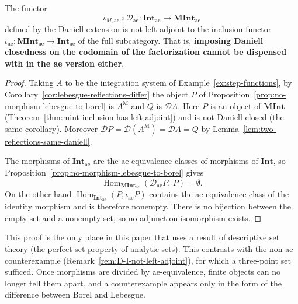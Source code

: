 \begin{corollary}\label{cor:ae-completeness-needed}
  The functor
  \[
    \iota_{M,\mathrm{ae}}\circ\mathcal{D}_{\mathrm{ae}}:
    \mathbf{Int}_{\mathrm{ae}}\longrightarrow\mathbf{MInt}_{\mathrm{ae}}
  \]
  defined by the Daniell extension is not left adjoint to the inclusion functor
  $\iota_{\mathrm{ae}}:\mathbf{MInt}_{\mathrm{ae}}\to\mathbf{Int}_{\mathrm{ae}}$
  of the full subcategory.
  That is, \textbf{imposing Daniell closedness on the codomain of the
  factorization cannot be dispensed with in the ae version either}.
\end{corollary}
\begin{proof}
  Taking $A$ to be the integration system of
  Example~\ref{ex:step-functions}, by
  Corollary~\ref{cor:lebesgue-reflections-differ} the object $P$ of
  Proposition~\ref{prop:no-morphism-lebesgue-to-borel} is $A^{\mathrm{M}}$ and
  $Q$ is $\mathcal{D}A$.
  Here $P$ is an object of $\mathbf{MInt}$
  (Theorem~\ref{thm:mint-inclusion-has-left-adjoint}) and is not Daniell closed
  (the same corollary).
  Moreover $\mathcal{D}P=\mathcal{D}(A^{\mathrm{M}})=\mathcal{D}A=Q$ by
  Lemma~\ref{lem:two-reflections-same-daniell}.

  The morphisms of $\mathbf{Int}_{\mathrm{ae}}$ are the ae-equivalence classes of
  morphisms of $\mathbf{Int}$, so
  Proposition~\ref{prop:no-morphism-lebesgue-to-borel} gives
  \[
    \operatorname{Hom}_{\mathbf{MInt}_{\mathrm{ae}}}(\mathcal{D}_{\mathrm{ae}}P,\,P)=\emptyset .
  \]
  On the other hand
  $\operatorname{Hom}_{\mathbf{Int}_{\mathrm{ae}}}(P,\iota_{\mathrm{ae}}P)$
  contains the ae-equivalence class of the identity morphism and is therefore
  nonempty.
  There is no bijection between the empty set and a nonempty set, so no
  adjunction isomorphism exists.
\end{proof}

\begin{remark}
  This proof is the only place in this paper that uses a result of descriptive
  set theory (the perfect set property of analytic sets).
  This contrasts with the non-ae counterexample
  (Remark~\ref{rem:D-I-not-left-adjoint}), for which a three-point set
  sufficed.
  Once morphisms are divided by ae-equivalence, finite objects can no longer
  tell them apart, and a counterexample appears only in the form of the
  difference between Borel and Lebesgue.
\end{remark}
